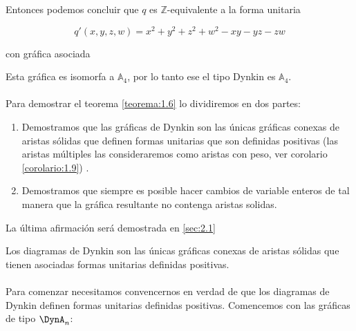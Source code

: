 \begin{example}
Entonces podemos concluir que $q$ es $\mathbb{Z}$-equivalente a la forma unitaria

\begin{equation*}
q'\left(x, y, z, w\right) = x^{2} + y^{2} + z^{2} + w^{2} - xy - yz - zw
\end{equation*}

con gráfica asociada

\begin{center}
\end{center}

Esta gráfica es isomorfa a $\mathbb{A}_{4}$, por lo tanto ese el tipo Dynkin es $\mathbb{A}_{4}$.
\end{example}

\paragraph{}
Para demostrar el teorema \ref{teorema:1.6} lo dividiremos en dos partes:

\begin{enumerate}
    \item Demostramos que las gráficas de Dynkin son las únicas gráficas conexas de aristas sólidas que definen formas unitarias que son definidas positivas (las aristas múltiples las consideraremos como aristas con peso, ver corolario \ref{corolario:1.9}) .
    \item Demostramos que siempre es posible hacer cambios de variable enteros de tal manera que la gráfica resultante no contenga aristas solidas.
\end{enumerate}

La última afirmación será demostrada en \ref{sec:2.1}

\begin{lemma}
Los diagramas de Dynkin son las únicas gráficas conexas de aristas sólidas que tienen asociadas formas unitarias definidas positivas.
\label{lema:1.7}
\end{lemma}

\paragraph{}
Para comenzar necesitamos convencernos en verdad de que los diagramas de Dynkin definen formas unitarias definidas positivas. Comencemos con las gráficas de tipo $\DynA_{n}$:

